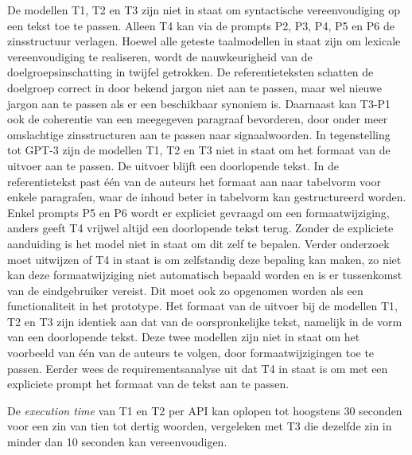 De modellen T1, T2 en T3 zijn niet in staat om syntactische vereenvoudiging op een tekst toe te passen. Alleen T4 kan via de prompts P2, P3, P4, P5 en P6 de zinsstructuur verlagen. Hoewel alle geteste taalmodellen in staat zijn om lexicale vereenvoudiging te realiseren, wordt de nauwkeurigheid van de doelgroepsinschatting in twijfel getrokken. De referentieteksten schatten de doelgroep correct in door bekend jargon niet aan te passen, maar wel nieuwe jargon aan te passen als er een beschikbaar synoniem is.  Daarnaast kan T3-P1 ook de coherentie van een meegegeven paragraaf bevorderen, door onder meer omslachtige zinsstructuren aan te passen naar signaalwoorden. In tegenstelling tot GPT-3 zijn de modellen T1, T2 en T3 niet in staat om het formaat van de uitvoer aan te passen. De uitvoer blijft een doorlopende tekst. In de referentietekst past één van de auteurs het formaat aan naar tabelvorm voor enkele paragrafen, waar de inhoud beter in tabelvorm kan gestructureerd worden. Enkel prompts P5 en P6 wordt er expliciet gevraagd om een formaatwijziging, anders geeft T4 vrijwel altijd een doorlopende tekst terug. Zonder de expliciete aanduiding is het model niet in staat om dit zelf te bepalen. Verder onderzoek moet uitwijzen of T4 in staat is om zelfstandig deze bepaling kan maken, zo niet kan deze formaatwijziging niet automatisch bepaald worden en is er tussenkomst van de eindgebruiker vereist. Dit moet ook zo opgenomen worden als een functionaliteit in het prototype. Het formaat van de uitvoer bij de modellen T1, T2 en T3 zijn identiek aan dat van de oorspronkelijke tekst, namelijk in de vorm van een doorlopende tekst. Deze twee modellen zijn niet in staat om het voorbeeld van één van de auteurs te volgen, door formaatwijzigingen toe te passen. Eerder wees de requirementsanalyse uit dat T4 in staat is om met een expliciete prompt het formaat van de tekst aan te passen.

\medspace

De \textit{execution time} van T1 en T2 per API kan oplopen tot hoogstens 30 seconden voor een zin van tien tot dertig woorden, vergeleken met T3 die dezelfde zin in minder dan 10 seconden kan vereenvoudigen.

\medspace


